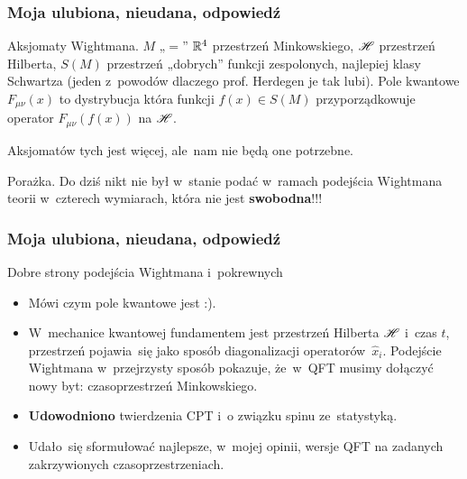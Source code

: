 \documentclass[10pt,t]{beamer}
\begin{document}
\begin{frame}
  \frametitle{Moja ulubiona, nieudana, odpowiedź}


  Aksjomaty Wightmana.
  $M$ „$=$” $\mathbb{R}^{ 4 }$ przestrzeń Minkowskiego, $\mathcal{H}$ przestrzeń
  Hilberta, $S( M )$ przestrzeń „dobrych” funkcji zespolonych, najlepiej
  klasy Schwartza (jeden z~powodów dlaczego prof. Herdegen je tak lubi).
  Pole kwantowe $F_{ \mu \nu }( x )$ to dystrybucja która funkcji
  $f( x ) \in S( M )$ przyporządkowuje operator $F_{ \mu \nu }( f( x ) )$ na
  $\mathcal{H}$.

  Aksjomatów tych jest więcej, ale~nam nie będą one potrzebne.

  { \color{red} Porażka. }
  Do dziś nikt nie był w~stanie podać w~ramach podejścia Wightmana
  teorii w~czterech wymiarach, która nie jest \textbf{swobodna}!!!

\end{frame}





\begin{frame}
  \frametitle{Moja ulubiona, nieudana, odpowiedź}


  Dobre strony podejścia Wightmana i~pokrewnych
  \begin{itemize}
    \RaggedRight

  \item Mówi czym pole kwantowe jest :).

  \item W~mechanice kwantowej fundamentem jest przestrzeń
    Hilberta $\mathcal{H}$ i~czas $t$, przestrzeń pojawia~się jako
    sposób diagonalizacji operatorów~$\widehat{x}_{ i }$. Podejście
    Wightmana w~przejrzysty sposób pokazuje, że~w~QFT musimy
    dołączyć nowy byt: czasoprzestrzeń Minkowskiego.

  \item \textbf{Udowodniono} twierdzenia CPT i~o związku spinu ze~statystyką.

  \item Udało~się sformułować najlepsze, w~mojej opinii, wersje
    QFT na zadanych zakrzywionych czasoprzestrzeniach.

  \end{itemize}

\end{frame}
\end{document}
